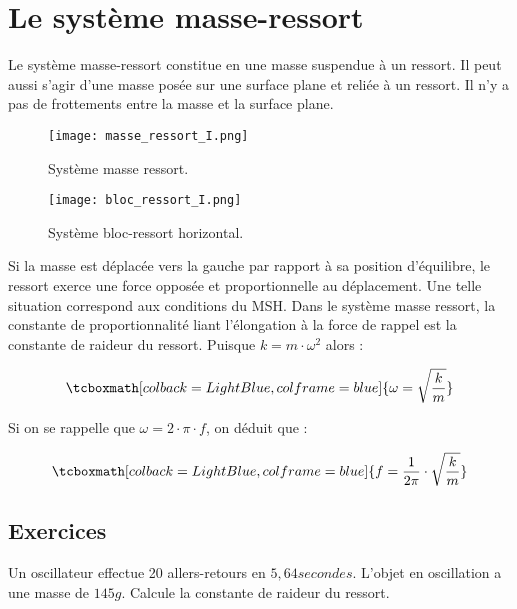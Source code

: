\chapter{Le système masse-ressort}
Le système masse-ressort constitue en une masse suspendue à un ressort. Il peut aussi s'agir d'une masse posée sur une surface plane et reliée à un ressort. Il n'y a pas de frottements entre la masse et la surface plane.

\begin{figure}[ht!]
    \begin{minipage}{.5\textwidth}
        \centering
        \texttt{[image: masse\_ressort\_I.png]}
        \caption{Système masse ressort.}
        \label{masse_ressort_I}
    \end{minipage}
    \begin{minipage}{.5\textwidth}
        \centering
        \texttt{[image: bloc\_ressort\_I.png]}
        \caption{Système bloc-ressort horizontal.}
        \label{bloc_ressort_I}
    \end{minipage}
\end{figure}

\newpage

Si la masse est déplacée vers la gauche par rapport à sa position d'équilibre, le ressort exerce une force opposée  et proportionnelle au déplacement. Une telle situation correspond aux conditions du MSH.
Dans le système masse ressort, la constante de proportionnalité liant l'élongation à la force de rappel est la constante de raideur du ressort. Puisque \(k=m \cdot \omega ^2\) alors :

\begin{equation}
    \tcboxmath[colback=LightBlue,colframe=blue]
    {\omega = \sqrt{\frac{k}{m}}}
\end{equation}


Si on se rappelle que \(\omega=2 \cdot \pi \cdot f\), on déduit que :

\begin{equation}
    \tcboxmath[colback=LightBlue,colframe=blue]
    {f=\frac{1}{2\pi} \cdot \sqrt{\frac{k}{m}}}
\end{equation}

\newpage

\section{Exercices}
\begin{exercise}
    Un oscillateur effectue 20 allers-retours en \(5,64 secondes\). L'objet en oscillation a une masse de \(145g\). Calcule la constante de raideur du ressort.
\end{exercise}

